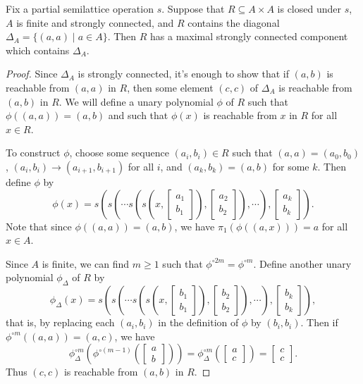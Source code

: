 \documentclass[letterpaper,11pt]{article}
\begin{document}
\begin{thm}\label{strong-diagonal} Fix a partial semilattice operation $s$. Suppose that $R \subseteq A \times A$ is closed under $s$, $A$ is finite and strongly connected, and $R$ contains the diagonal $\Delta_A = \{(a,a) \mid a \in A\}$. Then $R$ has a maximal strongly connected component which contains $\Delta_A$.
\end{thm}
\begin{proof} Since $\Delta_A$ is strongly connected, it's enough to show that if $(a,b)$ is reachable from $(a,a)$ in $R$, then some element $(c,c)$ of $\Delta_A$ is reachable from $(a,b)$ in $R$. We will define a unary polynomial $\phi$ of $R$ such that $\phi((a,a)) = (a,b)$ and such that $\phi(x)$ is reachable from $x$ in $R$ for all $x \in R$.

To construct $\phi$, choose some sequence $(a_i,b_i) \in R$ such that $(a,a) = (a_0,b_0)$, $(a_i,b_i) \rightarrow (a_{i+1},b_{i+1})$ for all $i$, and $(a_k,b_k) = (a,b)$ for some $k$. Then define $\phi$ by
\[
\phi(x) = s\left(s\left(\cdots s\left(s\left(x,\begin{bmatrix}a_1\\b_1\end{bmatrix}\right), \begin{bmatrix}a_2\\b_2\end{bmatrix}\right),\cdots\right), \begin{bmatrix}a_k\\b_k\end{bmatrix}\right).
\]
Note that since $\phi((a,a)) = (a,b)$, we have $\pi_1(\phi((a,x))) = a$ for all $x \in A$.

Since $A$ is finite, we can find $m \ge 1$ such that $\phi^{\circ 2m} = \phi^{\circ m}$. Define another unary polynomial $\phi_\Delta$ of $R$ by
\[
\phi_\Delta(x) = s\left(s\left(\cdots s\left(s\left(x,\begin{bmatrix}b_1\\b_1\end{bmatrix}\right), \begin{bmatrix}b_2\\b_2\end{bmatrix}\right),\cdots\right), \begin{bmatrix}b_k\\b_k\end{bmatrix}\right),
\]
that is, by replacing each $(a_i,b_i)$ in the definition of $\phi$ by $(b_i,b_i)$. Then if $\phi^{\circ m}((a,a)) = (a,c)$, we have
\[
\phi_\Delta^{\circ m}\left(\phi^{\circ (m-1)}\left(\begin{bmatrix} a\\ b\end{bmatrix}\right)\right) = \phi_\Delta^{\circ m}\left(\begin{bmatrix} a\\ c\end{bmatrix}\right) = \begin{bmatrix} c\\ c\end{bmatrix}.
\]
Thus $(c,c)$ is reachable from $(a,b)$ in $R$.
\end{proof}
\end{document}
